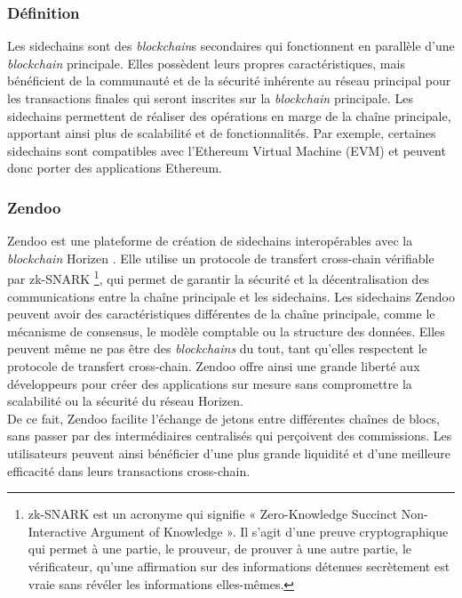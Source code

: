 \subsubsection{Définition}
Les sidechains sont des \textit{blockchain}s secondaires qui fonctionnent en parallèle d'une \textit{blockchain} principale. Elles possèdent leurs propres caractéristiques, mais bénéficient de la communauté et de la sécurité inhérente au réseau principal pour les transactions finales qui seront inscrites sur la \textit{blockchain} principale. Les sidechains permettent de réaliser des opérations en marge de la chaîne principale, apportant ainsi plus de scalabilité et de fonctionnalités. Par exemple, certaines sidechains sont compatibles avec l'Ethereum Virtual Machine (EVM) et peuvent donc porter des applications Ethereum.

\subsubsection{Zendoo}
Zendoo est une plateforme de création de sidechains interopérables avec la \textit{blockchain} Horizen \cite{garoffolo2020zendoo}. Elle utilise un protocole de transfert cross-chain vérifiable par zk-SNARK \footnote{zk-SNARK est un acronyme qui signifie « Zero-Knowledge Succinct Non-Interactive Argument of Knowledge ». Il s'agit d'une preuve cryptographique qui permet à une partie, le prouveur, de prouver à une autre partie, le vérificateur, qu'une affirmation sur des informations détenues secrètement est vraie sans révéler les informations elles-mêmes.}, qui permet de garantir la sécurité et la décentralisation des communications entre la chaîne principale et les sidechains. Les sidechains Zendoo peuvent avoir des caractéristiques différentes de la chaîne principale, comme le mécanisme de consensus, le modèle comptable ou la structure des données. Elles peuvent même ne pas être des \textit{blockchains} du tout, tant qu'elles respectent le protocole de transfert cross-chain. Zendoo offre ainsi une grande liberté aux développeurs pour créer des applications sur mesure sans compromettre la scalabilité ou la sécurité du réseau Horizen.\\
De ce fait, Zendoo facilite l'échange de jetons entre différentes chaînes de blocs, sans passer par des intermédiaires centralisés qui perçoivent des commissions. Les utilisateurs peuvent ainsi bénéficier d'une plus grande liquidité et d'une meilleure efficacité dans leurs transactions cross-chain.

